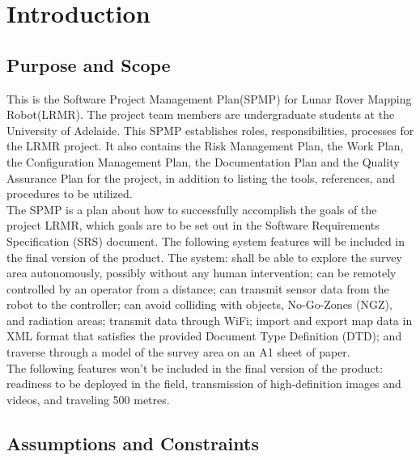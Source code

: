 \documentclass[12pt,a4paper]{article}
\begin{document}
    \vspace{50px}
    \listoffigures
    \vspace{50px}
    \listoftables
	
	\newpage
	
	
	\section{Introduction}
	\subsection{Purpose and Scope}
   This is the Software Project Management Plan(SPMP) for Lunar Rover Mapping Robot(LRMR). The project team members are undergraduate students at the University of Adelaide. This SPMP establishes roles, responsibilities, processes for the LRMR project. It also contains the Risk Management Plan, the Work Plan, the Configuration Management Plan, the Documentation Plan and the Quality Assurance Plan for the project, in addition to listing the tools, references, and procedures to be utilized.\\
     The SPMP is a plan about how to successfully accomplish the goals of the project LRMR, which goals are to be set out in the Software Requirements Specification (SRS) document. 
    The following system features will be included in the final version of the product. The system: shall be able to explore the survey area autonomously, possibly without any human intervention; can be remotely controlled by an operator from a distance; can transmit sensor data from the robot to the controller; can avoid colliding with objects, No-Go-Zones (NGZ), and radiation areas; transmit data through WiFi; import and export map data in XML format that satisfies the provided Document Type Definition (DTD); and traverse through a model of the survey area on an A1 sheet of paper.\\
    The following features won't be included in the final version of the product: readiness to be deployed in the field, transmission of high-definition images and videos, and traveling 500 metres.
    
\subsection{Assumptions and Constraints}
\end{document}

